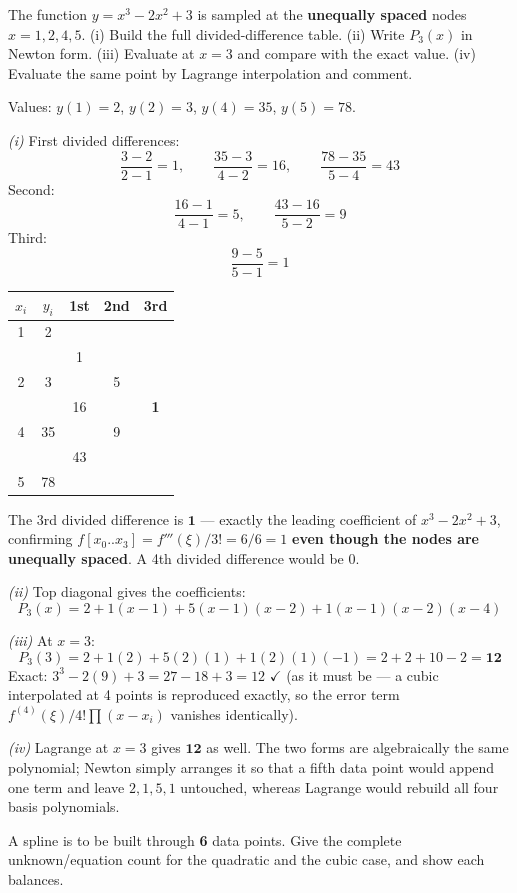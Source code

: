 \begin{probbox}
 The function $y = x^3-2x^2+3$ is sampled at the \textbf{unequally spaced} nodes $x = 1, 2, 4, 5$. (i) Build the full divided-difference table. (ii) Write $P_3(x)$ in Newton form. (iii) Evaluate at $x=3$ and compare with the exact value. (iv) Evaluate the same point by Lagrange interpolation and comment.

\ans Values: $y(1) = 2$, $y(2) = 3$, $y(4) = 35$, $y(5) = 78$.

\emph{(i)} First divided differences:
\[
\frac{3-2}{2-1} = 1, \qquad \frac{35-3}{4-2} = 16, \qquad \frac{78-35}{5-4} = 43
\]
Second:
\[
\frac{16-1}{4-1} = 5, \qquad \frac{43-16}{5-2} = 9
\]
Third:
\[
\frac{9-5}{5-1} = 1
\]
\begin{center}\small
\begin{tabular}{@{}ccccc@{}}
\toprule
$x_i$ & $y_i$ & 1st & 2nd & 3rd\\
\midrule
1 & 2 & & & \\
 & & 1 & & \\
2 & 3 & & 5 & \\
 & & 16 & & \textbf{1}\\
4 & 35 & & 9 & \\
 & & 43 & & \\
5 & 78 & & & \\
\bottomrule
\end{tabular}
\end{center}
The 3rd divided difference is $\mathbf{1}$ --- exactly the leading coefficient of $x^3-2x^2+3$, confirming $f[x_0..x_3] = f'''(\xi)/3! = 6/6 = 1$ \textbf{even though the nodes are unequally spaced}. A 4th divided difference would be $0$.

\emph{(ii)} Top diagonal gives the coefficients:
\[
P_3(x) = 2 + 1(x-1) + 5(x-1)(x-2) + 1(x-1)(x-2)(x-4)
\]

\emph{(iii)} At $x=3$:
\[
P_3(3) = 2 + 1(2) + 5(2)(1) + 1(2)(1)(-1) = 2+2+10-2 = \mathbf{12}
\]
Exact: $3^3-2(9)+3 = 27-18+3 = 12$ $\checkmark$ (as it must be --- a cubic interpolated at 4 points is reproduced exactly, so the error term $f^{(4)}(\xi)/4!\prod(x-x_i)$ vanishes identically).

\emph{(iv)} Lagrange at $x=3$ gives $\mathbf{12}$ as well. The two forms are algebraically the same polynomial; Newton simply arranges it so that a fifth data point would append one term and leave $2, 1, 5, 1$ untouched, whereas Lagrange would rebuild all four basis polynomials.

 A spline is to be built through \textbf{6} data points. Give the complete unknown/equation count for the quadratic and the cubic case, and show each balances.


\end{probbox}
